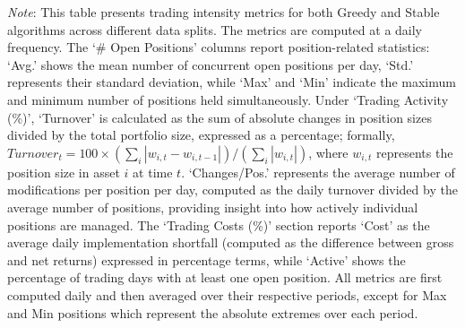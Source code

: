 \begin{table}[htbp]
\vspace{0.5cm}
\begin{minipage}{\textwidth}
\setlength{\parindent}{0pt}
\small\textit{Note}: 
This table presents trading intensity metrics for both Greedy and Stable algorithms across different data splits. 
The metrics are computed at a daily frequency. The `\# Open Positions' columns report position-related statistics: 
`Avg.' shows the mean number of concurrent open positions per day, `Std.' represents their standard deviation, while 
`Max' and `Min' indicate the maximum and minimum number of positions held simultaneously. Under `Trading Activity (\%)', 
`Turnover' is calculated as the sum of absolute changes in position sizes divided by the total portfolio size, expressed 
as a percentage; formally, $Turnover_t = 100 \times (\sum_i |w_{i,t} - w_{i,t-1}|)/(\sum_i |w_{i,t}|)$, where $w_{i,t}$ 
represents the position size in asset $i$ at time $t$. `Changes/Pos.' represents the average number of modifications per 
position per day, computed as the daily turnover divided by the average number of positions, providing insight into how 
actively individual positions are managed. The `Trading Costs (\%)' section reports `Cost' as the average daily implementation 
shortfall (computed as the difference between gross and net returns) expressed in percentage terms, while `Active' shows 
the percentage of trading days with at least one open position. All metrics are first computed daily and then averaged 
over their respective periods, except for Max and Min positions which represent the absolute extremes over each period.
\end{minipage}
\end{table}